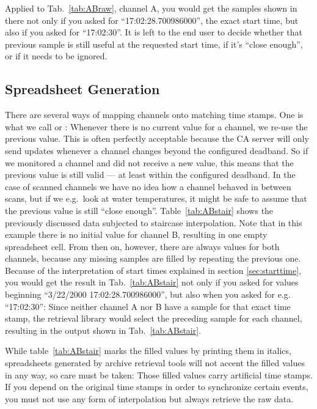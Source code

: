 Applied to Tab.~\ref{tab:ABraw}, channel A, you would get the samples
shown in there not only if you asked for ``17:02:28.700986000'', the
exact start time, but also if you asked for ``17:02:30''.
It is left to the end user to decide whether that previous sample is
still useful at the requested start time, if it's ``close enough'', or
if it needs to be ignored.

\subsection{Spreadsheet Generation} \label{sec:filling}
There are several ways of mapping channels onto matching time
stamps. One is what we call  or
: Whenever there is no current value for a channel, we
re-use the previous value. This is often perfectly acceptable because
the CA server will only send updates whenever a channel changes beyond
the configured deadband. So if we monitored a channel and did not
receive a new value, this means that the previous value is still valid
--- at least within the configured deadband. In the case of scanned
channels we have no idea how a channel behaved in between scans, but
if we e.g.\ look at water temperatures, it might be safe to assume
that the previous value is still ``close enough''.
Table~\ref{tab:ABstair} shows the previously discussed data subjected
to staircase interpolation. Note that in this example there is no
initial value for channel B, resulting in one empty spreadsheet
cell. From then on, however, there are always values for both
channels, because any missing samples are filled by repeating the
previous one.  Because of the interpretation of start times explained
in section \ref{sec:starttime}, you would get the result in
 Tab.\ \ref{tab:ABstair} not only if you asked for values beginning
``3/22/2000 17:02:28.700986000'', but also when you asked for
e.g. ``17:02:30'': Since neither channel A nor B have a sample for that
exact time stamp, the retrieval library would select the
preceding sample for each channel, resulting in the output shown in 
Tab.\ \ref{tab:ABstair}.

\NOTE While table~\ref{tab:ABstair} marks the filled values by
printing them in italics, spreadsheets generated by archive retrieval
tools will not accent the filled values in any way, so care must be
taken: Those filled values carry artificial time stamps. If you depend
on the original time stamps in order to synchronize certain events,
you must not use any form of interpolation but always retrieve the raw
data. 

